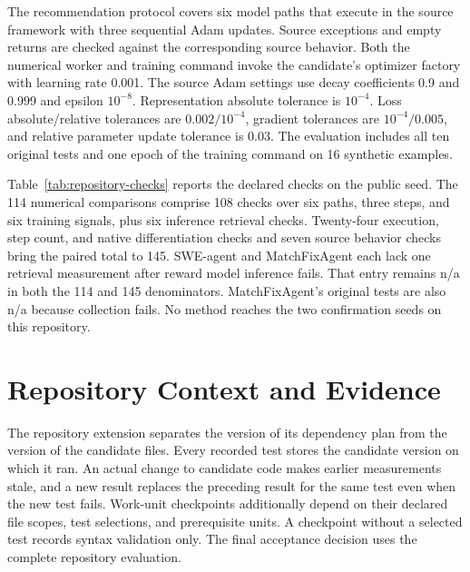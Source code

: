 The recommendation protocol covers six model paths that execute in the source framework with three sequential Adam updates. Source exceptions and empty returns are checked against the corresponding source behavior. Both the numerical worker and training command invoke the candidate's optimizer factory with learning rate 0.001. The source Adam settings use decay coefficients 0.9 and 0.999 and epsilon $10^{-8}$. Representation absolute tolerance is $10^{-4}$. Loss absolute/relative tolerances are $0.002/10^{-4}$, gradient tolerances are $10^{-4}/0.005$, and relative parameter update tolerance is 0.03. The evaluation includes all ten original tests and one epoch of the training command on 16 synthetic examples.

Table~\ref{tab:repository-checks} reports the declared checks on the public seed. The 114 numerical comparisons comprise 108 checks over six paths, three steps, and six training signals, plus six inference retrieval checks. Twenty-four execution, step count, and native differentiation checks and seven source behavior checks bring the paired total to 145. SWE-agent and MatchFixAgent each lack one retrieval measurement after reward model inference fails. That entry remains n/a in both the 114 and 145 denominators. MatchFixAgent's original tests are also n/a because collection fails. No method reaches the two confirmation seeds on this repository.

\begin{table}[!htb]
\caption{Recommendation repository checks passed on the public seed. The numerical checks are a subset of paired checks, and the six training signal rows break down the training checks. One unmeasured retrieval check remains in each baseline's denominator.}
\label{tab:repository-checks}
\centering
\small
\setlength{\tabcolsep}{4pt}

\end{table}

\section{Repository Context and Evidence}
\label{sec:repository-context}

The repository extension separates the version of its dependency plan from the version of the candidate files. Every recorded test stores the candidate version on which it ran. An actual change to candidate code makes earlier measurements stale, and a new result replaces the preceding result for the same test even when the new test fails. Work-unit checkpoints additionally depend on their declared file scopes, test selections, and prerequisite units. A checkpoint without a selected test records syntax validation only. The final acceptance decision uses the complete repository evaluation.

